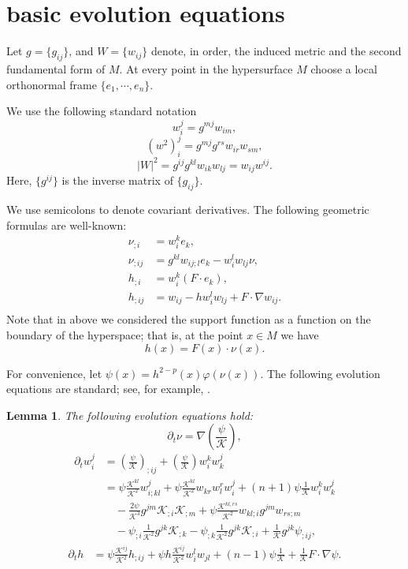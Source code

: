 \documentclass{amsart}
\newtheorem{lemma}[theorem]{Lemma}
\theoremstyle{definition}
\theoremstyle{remark}
\numberwithin{equation}{section}
\begin{document}
\section{basic evolution equations}

Let $g=\{g_{ij}\}$, and $W=\{w_{ij}\}$ denote, in order, the induced metric and the second fundamental form of $M$. At every point in the hypersurface $M$ choose a local orthonormal frame $\{e_1,\cdots, e_n\}.$

We use the following standard notation
\[w_i^j=g^{mj}w_{im},\]
\[(w^2)_i^j=g^{mj}g^{rs}w_{ir}w_{sm},\]
\[|W|^2=g^{ij}g^{kl}w_{ik}w_{lj}=w_{ij}w^{ij}.\]
Here, $\{g^{ij}\}$ is the inverse matrix of $\{g_{ij}\}.$


We use semicolons to denote covariant derivatives. The following geometric formulas are well-known:
\begin{align*}
\nu_{;i} &= w_i^ke_k,\\
\nu_{;ij} &= g^{kl}w_{ij;l}e_k - w_i^lw_{lj}\nu,\\
h_{;i} &= w_i^k (F\cdot e_k),\\
h_{;ij} &= w_{ij} - hw_i^lw_{lj} + F \cdot \nabla w_{ij}.\\
\end{align*}
Note that in above we considered the support function as a function on the boundary of the hyperspace; that is, at the point $x\in M$ we have
$$h(x)=F(x)\cdot \nu(x).$$


For convenience, let $\psi(x)=h^{2-p}(x)\varphi(\nu(x))$. The following evolution equations are standard; see, for example, \cite{Gerhardt:/2006}.
\begin{lemma} The following evolution equations hold:
\[\partial_t \nu = \nabla \left(\frac{\psi}{\mathcal{K}}\right),\]
\begin{align*}
\partial_t w_i^j &= \left(\frac{\psi}{\mathcal{K}}\right)_{;ij} + \left(\frac{\psi}{\mathcal{K}}\right) w_i^kw_k^j \\
&= \psi \frac{\mathcal{K}^{kl}}{\mathcal{K}^2} w_{i;kl}^j + \psi \frac{\mathcal{K}^{kl}}{\mathcal{K}^2} w_{kr}w_l^rw_i^j +(n+1)\psi \frac{1}{\mathcal{K}} w_{i}^k w_k^{j} \\
&\quad - \frac{2\psi}{\mathcal{K}^{3}} g^{jm} \mathcal{K}_{;i} \mathcal{K}_{;m} + \psi\frac{\mathcal{K}^{kl,rs}}{\mathcal{K}^{2}} w_{kl;i}g^{jm}w_{rs;m} \\
&\quad - \psi_{;i} \frac{1}{\mathcal{K}^{2}} g^{jk} \mathcal{K}_{;k} - \psi_{;k} \frac{1}{\mathcal{K}^{2}} g^{jk} \mathcal{K}_{;i} + \frac{1}{\mathcal{K}} g^{jk}\psi_{;ij},
\end{align*}
\begin{align*}
\partial_th &= \psi \frac{\mathcal{K}^{ij}}{\mathcal{K}^{2}} h_{;ij} + \psi h \frac{\mathcal{K}^{ij}}{\mathcal{K}^{2}} w_i^lw_{jl} + (n-1) \psi \frac{1}{\mathcal{K}}+ \frac{1}{\mathcal{K}} F\cdot\nabla\psi.
\end{align*}
\end{lemma}
\end{document}

